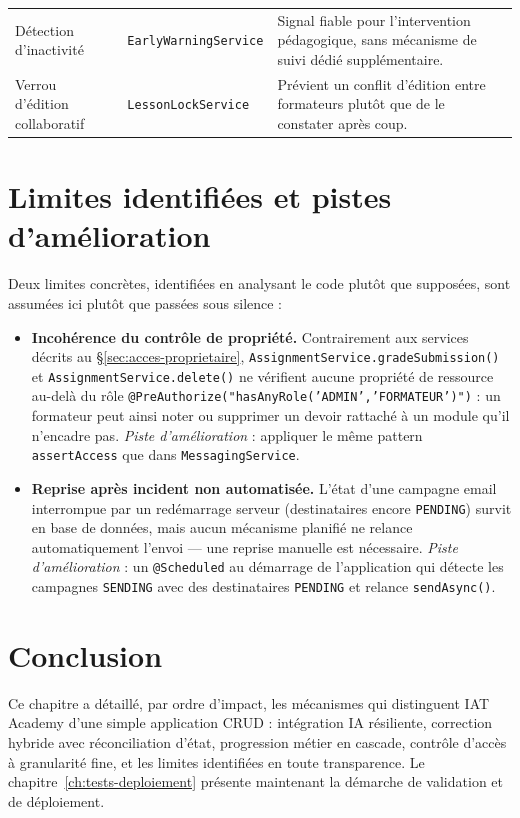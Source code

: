 \begin{table}[H]
\begin{tabular}{@{}p{2.6cm}p{4.1cm}p{6.3cm}@{}}
    Détection d'inactivité & \texttt{EarlyWarning\allowbreak Service} & Signal fiable pour l'intervention pédagogique, sans mécanisme de suivi dédié supplémentaire. \\
    Verrou d'édition collaboratif & \texttt{LessonLock\allowbreak Service} & Prévient un conflit d'édition entre formateurs plutôt que de le constater après coup. \\
    \bottomrule
  \end{tabular}
\end{table}

\section{Limites identifiées et pistes d'amélioration}
\label{sec:limites}

Deux limites concrètes, identifiées en analysant le code plutôt que
supposées, sont assumées ici plutôt que passées sous silence :

\begin{itemize}
  \item \textbf{Incohérence du contrôle de propriété.} Contrairement aux
    services décrits au \S\ref{sec:acces-proprietaire},
    \texttt{AssignmentService.gradeSubmission()} et
    \texttt{AssignmentService.delete()} ne vérifient aucune propriété de
    ressource au-delà du rôle \texttt{@PreAuthorize("hasAnyRole('ADMIN','FORMATEUR')")} :
    un formateur peut ainsi noter ou supprimer un devoir rattaché à un
    module qu'il n'encadre pas. \emph{Piste d'amélioration} : appliquer le
    même pattern \texttt{assertAccess} que dans \texttt{MessagingService}.
  \item \textbf{Reprise après incident non automatisée.} L'état d'une
    campagne email interrompue par un redémarrage serveur (destinataires
    encore \texttt{PENDING}) survit en base de données, mais aucun
    mécanisme planifié ne relance automatiquement l'envoi --- une reprise
    manuelle est nécessaire. \emph{Piste d'amélioration} : un
    \texttt{@Scheduled} au démarrage de l'application qui détecte les
    campagnes \texttt{SENDING} avec des destinataires \texttt{PENDING} et
    relance \texttt{sendAsync()}.
\end{itemize}

\section{Conclusion}

Ce chapitre a détaillé, par ordre d'impact, les mécanismes qui distinguent
IAT Academy d'une simple application CRUD : intégration IA résiliente,
correction hybride avec réconciliation d'état, progression métier en
cascade, contrôle d'accès à granularité fine, et les limites identifiées
en toute transparence. Le chapitre~\ref{ch:tests-deploiement} présente
maintenant la démarche de validation et de déploiement.
